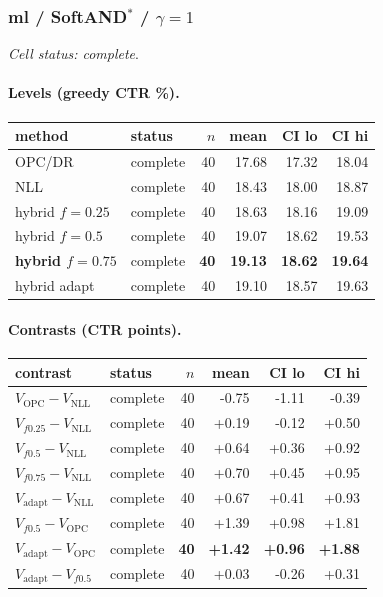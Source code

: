 \documentclass[10pt,a4paper]{article}
\begin{document}
\subsubsection{ml / SoftAND$^*$ / $\gamma=1$}
\emph{Cell status: complete}.
\paragraph{Levels (greedy CTR \%).}
{\centering\small\begin{tabular}{llrrrr}
\toprule method & status & $n$ & mean & CI lo & CI hi \\
\midrule
OPC/DR & complete & 40 & 17.68 & 17.32 & 18.04 \\
NLL & complete & 40 & 18.43 & 18.00 & 18.87 \\
hybrid $f{=}0.25$ & complete & 40 & 18.63 & 18.16 & 19.09 \\
hybrid $f{=}0.5$ & complete & 40 & 19.07 & 18.62 & 19.53 \\
\textbf{hybrid $f{=}0.75$} & complete & \textbf{40} & \textbf{19.13} & \textbf{18.62} & \textbf{19.64} \\
hybrid adapt & complete & 40 & 19.10 & 18.57 & 19.63 \\
\bottomrule\end{tabular}\par}
\paragraph{Contrasts (CTR points).}
{\centering\small\begin{tabular}{llrrrr}
\toprule contrast & status & $n$ & mean & CI lo & CI hi \\
\midrule
$V_{\mathrm{OPC}}-V_{\mathrm{NLL}}$ & complete & 40 & -0.75 & -1.11 & -0.39 \\
$V_{f0.25}-V_{\mathrm{NLL}}$ & complete & 40 & +0.19 & -0.12 & +0.50 \\
$V_{f0.5}-V_{\mathrm{NLL}}$ & complete & 40 & +0.64 & +0.36 & +0.92 \\
$V_{f0.75}-V_{\mathrm{NLL}}$ & complete & 40 & +0.70 & +0.45 & +0.95 \\
$V_{\mathrm{adapt}}-V_{\mathrm{NLL}}$ & complete & 40 & +0.67 & +0.41 & +0.93 \\
$V_{f0.5}-V_{\mathrm{OPC}}$ & complete & 40 & +1.39 & +0.98 & +1.81 \\
\textbf{$V_{\mathrm{adapt}}-V_{\mathrm{OPC}}$} & complete & \textbf{40} & \textbf{+1.42} & \textbf{+0.96} & \textbf{+1.88} \\
$V_{\mathrm{adapt}}-V_{f0.5}$ & complete & 40 & +0.03 & -0.26 & +0.31 \\
\bottomrule\end{tabular}\par}
\end{document}

